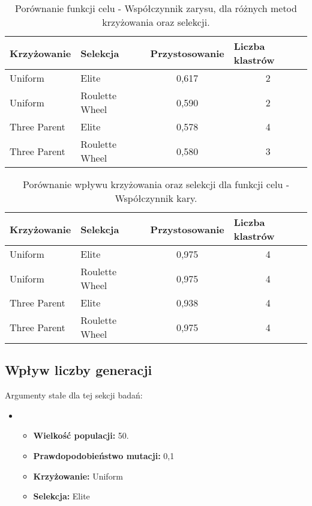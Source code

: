 \documentclass{classrep}
\begin{document}
\begin{table}[H]
\centering
\caption{Porównanie funkcji celu - Współczynnik zarysu, dla różnych metod krzyżowania oraz selekcji.}
\begin{tabular}{|l|l|c|c|}
\hline
\textbf{Krzyżowanie} & \textbf{Selekcja} & \multicolumn{1}{l|}{\textbf{Przystosowanie}} & \multicolumn{1}{l|}{\textbf{Liczba klastrów}} \\ \hline
Uniform & Elite & 0,617 & 2 \\ \hline
Uniform & Roulette Wheel & 0,590 & 2 \\ \hline
Three Parent & Elite & 0,578 & 4 \\ \hline
Three Parent & Roulette Wheel & 0,580 & 3 \\ \hline
\end{tabular}

\label{tab:calc1}
\end{table}

\begin{table}[H]
\centering
\caption{Porównanie wpływu krzyżowania oraz selekcji dla funkcji celu - Współczynnik kary.}
\begin{tabular}{|l|l|c|c|}
\hline
\textbf{Krzyżowanie} & \textbf{Selekcja} & \multicolumn{1}{l|}{\textbf{Przystosowanie}} & \multicolumn{1}{l|}{\textbf{Liczba klastrów}} \\ \hline
Uniform & Elite & 0,975 & 4 \\ \hline
Uniform & Roulette Wheel & 0,975 & 4 \\ \hline
Three Parent & Elite & 0,938 & 4 \\ \hline
Three Parent & Roulette Wheel & 0,975 & 4 \\ \hline
\end{tabular}
\label{tab:calc2}
\end{table}
\subsection{Wpływ liczby generacji}

Argumenty stałe dla tej sekcji badań:
\begin{itemize}
    \item[]
    \begin{itemize}
        \item \textbf{Wielkość populacji:} 50.
        \item \textbf{Prawdopodobieństwo mutacji:} 0,1
        \item \textbf{Krzyżowanie:} Uniform
        \item \textbf{Selekcja:} Elite
    \end{itemize}
\end{itemize}
\end{document}
